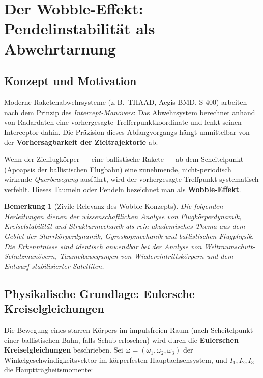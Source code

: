 ﻿\documentclass[12pt,a4paper]{article}
\newtheorem{bemerkung}{Bemerkung}[section]
\newcommand{\vek}[1]{\boldsymbol{#1}}
\begin{document}
\section{Der Wobble-Effekt: Pendelinstabilität als Abwehrtarnung}

\subsection{Konzept und Motivation}

Moderne Raketenabwehrsysteme (z.\,B.\ THAAD, Aegis BMD, S-400) arbeiten nach dem
Prinzip des \emph{Intercept-Manövers}: Das Abwehrsystem berechnet anhand von
Radardaten eine vorhergesagte Trefferpunktkoordinate und lenkt seinen Interceptor
dahin. Die Präzision dieses Abfangvorgangs hängt unmittelbar von der
\textbf{Vorhersagbarkeit der Zieltrajektorie} ab.

Wenn der Zielflugkörper --- eine ballistische Rakete --- ab dem Scheitelpunkt
(Apoapsis der ballistischen Flugbahn) eine zunehmende, nicht-periodisch wirkende
\emph{Querbewegung} ausführt, wird der vorhergesagte Treffpunkt systematisch
verfehlt. Dieses Taumeln oder Pendeln bezeichnet man als \textbf{Wobble-Effekt}.

\begin{bemerkung}[Zivile Relevanz des Wobble-Konzepts]
Die folgenden Herleitungen dienen der wissenschaftlichen Analyse von
Flugkörperdynamik, Kreiselstabilität und Strukturmechanik als rein akademisches
Thema aus dem Gebiet der Starrkörperdynamik, Gyroskopmechanik und ballistischen
Flugphysik. Die Erkenntnisse sind identisch anwendbar bei der Analyse von
Weltraumschutt-Schutzmanövern, Taumelbewegungen von Wiedereintrittskörpern und
dem Entwurf stabilisierter Satelliten.
\end{bemerkung}

\subsection{Physikalische Grundlage: Eulersche Kreiselgleichungen}

Die Bewegung eines starren Körpers im impulsfreien Raum (nach Scheitelpunkt einer
ballistischen Bahn, falls Schub erloschen) wird durch die \textbf{Eulerschen
Kreiselgleichungen} beschrieben. Sei $\vek{\omega} = (\omega_1, \omega_2, \omega_3)$
der Winkelgeschwindigkeitsvektor im körperfesten Hauptachsensystem, und
$I_1, I_2, I_3$ die Hauptträgheitsmomente:
\end{document}
